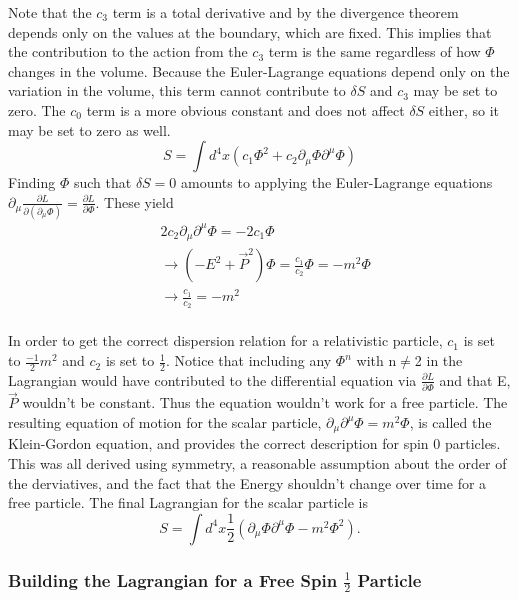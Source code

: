 Note that the $c_3$ term is a total derivative and by the divergence theorem depends only on the values at the boundary, which are fixed. This implies that the contribution to the action from the $c_3$ term is the same regardless of how $\Phi$ changes in the volume. Because the Euler-Lagrange equations depend only on the variation in the volume, this term cannot contribute to $\delta S$ and $c_3$ may be set to zero. The $c_0$ term is a more obvious constant and does not affect $\delta S$ either, so it may be set to zero as well. 
\begin{equation}
S = \int d^4x \left(c_1 \Phi^2 + c_2 \partial_\mu\Phi\partial^\mu\Phi\right)
\end{equation}
Finding $\Phi$ such that $\delta S = 0$ amounts to applying the Euler-Lagrange equations $\partial_\mu \frac{\partial L}{\partial\left(\partial_\mu\Phi\right)} = \frac{\partial L}{\partial \Phi}$. These yield 
\begin{equation}
\begin{split}
&2c_2\partial_\mu\partial^\mu\Phi = -2c_1\Phi \\ 
&\rightarrow (-E^2 + \vec{P}^2)\Phi = \frac{c_1}{c_2}\Phi = -m^2\Phi \\
&\rightarrow \frac{c_1}{c_2} = -m^2 \\
\end{split}
\end{equation}

In order to get the correct dispersion relation for a relativistic particle, $c_1$ is set to $\frac{-1}{2}m^2$ and $c_2$ is set to $\frac{1}{2}$. Notice that including any $\Phi^n$ with n$\neq$2 in the Lagrangian would have contributed to the differential equation via $\frac{\partial L}{\partial \Phi}$ and that E, $\vec{P}$ wouldn't be constant. Thus the equation wouldn't work for a free particle. The resulting equation of motion for the scalar particle, $\partial_\mu\partial^\mu\Phi = m^2\Phi$, is called the Klein-Gordon equation, and provides the correct description for spin 0 particles. This was all derived using symmetry, a reasonable assumption about the order of the derviatives, and the fact that the Energy shouldn't change over time for a free particle. The final Lagrangian for the scalar particle is 
\begin{equation}
S = \int d^4x \frac{1}{2}\left(\partial_\mu\Phi\partial^\mu\Phi - m^2 \Phi^2 \right).
\end{equation}

\subsubsection{Building the Lagrangian for a Free Spin $\frac{1}{2}$ Particle}

